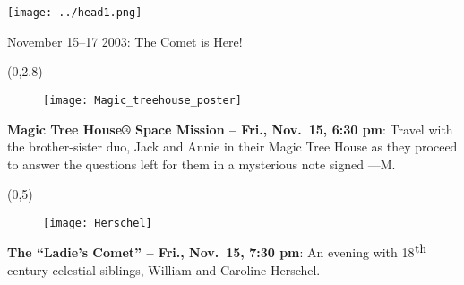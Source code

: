 \documentclass{article}
\begin{document}
\texttt{[image: ../head1.png]}
   {\fontsize{28}{8}
   \begin{centering}

   November 15–17 2003: The Comet is Here!

   \end{centering}
}
   

\begin{textblock}{3.9}(0,2.8)

   {\fontsize{19}{21}

   \begin{wrapfigure}{l}{0.9in}

          \texttt{[image: Magic\_treehouse\_poster]}
       
       \end{wrapfigure}      

       \textbf{Magic Tree House® Space Mission – Fri., Nov.~15, 6:30 pm}: Travel with the brother-sis\-ter duo, 
       Jack and
       Annie in their Magic Tree House as they pro\-ceed to an\-swer the questions left
       for them in a mysterious note signed —M. 
       
       }

\end{textblock}

\begin{textblock}{4.0}(0,5)
   \begin{wrapfigure}[12]{l}{2in}
      \texttt{[image: Herschel]}
   \end{wrapfigure}      

   {\fontsize{20}{32}
   \textbf{The “Ladie’s Com\-et” – Fri., Nov.~15, 7:30 pm}:
   An even\-ing with 18$^{\hbox{th}}$ century celestial siblings, Wil\-liam and Caroline
   Herschel. 

   }

\end{textblock}
\end{document}
